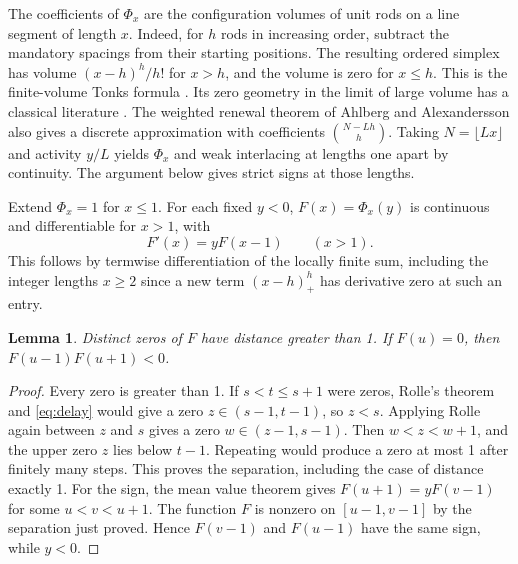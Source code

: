 \documentclass[11pt]{article}
\newtheorem{lemma}[theorem]{Lemma}
\begin{document}
The coefficients of \(\Phi_x\) are the configuration volumes of unit rods on a line segment of length \(x\). Indeed, for \(h\) rods in increasing order, subtract the mandatory spacings from their starting positions. The resulting ordered simplex has volume \((x-h)^h/h!\) for \(x>h\), and the volume is zero for \(x\le h\). This is the finite-volume Tonks formula \cite[Section~6.3.2, Eq.~(6.59) in the linked edition]{arovas}. Its zero geometry in the limit of large volume has a classical literature \cite{penrose}. The weighted renewal theorem of Ahlberg and Alexandersson \cite{renewal} also gives a discrete approximation with coefficients \(\binom{N-Lh}{h}\). Taking \(N=\lfloor Lx\rfloor\) and activity \(y/L\) yields \(\Phi_x\) and weak interlacing at lengths one apart by continuity. The argument below gives strict signs at those lengths.

Extend \(\Phi_x=1\) for \(x\le1\). For each fixed \(y<0\), \(F(x)=\Phi_x(y)\) is continuous and differentiable for \(x>1\), with
\begin{equation}\label{eq:delay}
 F'(x)=yF(x-1)\qquad(x>1).
\end{equation}
This follows by termwise differentiation of the locally finite sum, including the integer lengths \(x\ge2\) since a new term \((x-h)_+^h\) has derivative zero at such an entry.

\begin{lemma}\label{lem:delay}
Distinct zeros of \(F\) have distance greater than 1. If \(F(u)=0\), then \(F(u-1)F(u+1)<0\).
\end{lemma}
\begin{proof}
Every zero is greater than 1. If \(s<t\le s+1\) were zeros, Rolle's theorem and \eqref{eq:delay} would give a zero \(z\in(s-1,t-1)\), so \(z<s\). Applying Rolle again between \(z\) and \(s\) gives a zero \(w\in(z-1,s-1)\). Then \(w<z<w+1\), and the upper zero \(z\) lies below \(t-1\). Repeating would produce a zero at most 1 after finitely many steps. This proves the separation, including the case of distance exactly 1. For the sign, the mean value theorem gives \(F(u+1)=yF(v-1)\) for some \(u<v<u+1\). The function \(F\) is nonzero on \([u-1,v-1]\) by the separation just proved. Hence \(F(v-1)\) and \(F(u-1)\) have the same sign, while \(y<0\).
\end{proof}
\end{document}
